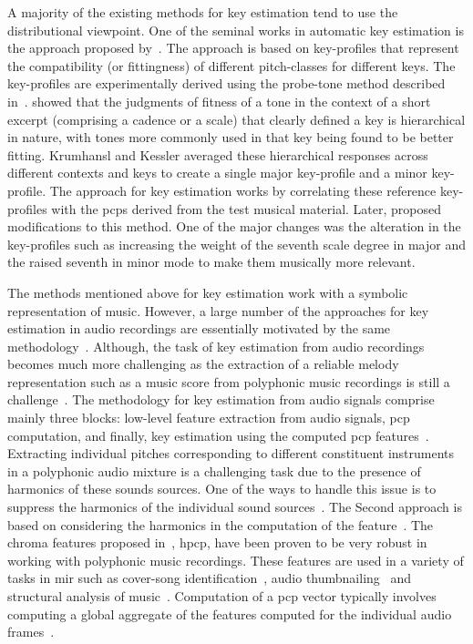 A majority of the existing methods for key estimation tend to use the distributional viewpoint. One of the seminal works in automatic key estimation is the approach proposed by~\cite{KrumhanslKessler82,krumhansl2001cognitive}. The approach is based on key-profiles that represent the compatibility (or fittingness) of different pitch-classes for different keys. The key-profiles are experimentally derived using the probe-tone method described in~\cite{krumhansl1979quantification}. \cite{krumhansl1979quantification} showed that the judgments of fitness of a tone in the context of a short excerpt (comprising a cadence or a scale) that clearly defined a key is hierarchical in nature, with tones more commonly used in that key being found to be better fitting. Krumhansl and Kessler averaged these hierarchical responses across different contexts and keys to create a single major key-profile and a minor key-profile. The approach for key estimation works by correlating these reference key-profiles with the \glspl{pcp} derived from the test musical material. Later, \cite{temperley1999s} proposed modifications to this method. One of the major changes was the alteration in the key-profiles such as increasing the weight of the seventh scale degree in major and the raised seventh in minor mode to make them musically more relevant. 

The methods mentioned above for key estimation work with a symbolic representation of music. However, a large number of the approaches for key estimation in audio recordings are essentially motivated by the same methodology~\citep{gomez2006tonal,pauws2004musical,peeters2006chroma}. Although, the task of key estimation from audio recordings becomes much more challenging as the extraction of a reliable melody representation such as a music score from polyphonic music recordings is still a challenge~\citep{gomez2006tonal}. The methodology for key estimation from audio signals comprise mainly three blocks: low-level feature extraction from audio signals, \gls{pcp} computation, and finally, key estimation using the computed \gls{pcp} features~\citep{peeters2006chroma}. Extracting individual pitches corresponding to different constituent instruments in a polyphonic audio mixture is a challenging task due to the presence of harmonics of these sounds sources. One of the ways to handle this issue is to suppress the harmonics of the individual sound sources~\citep{cremer2004a,peeters2006chroma}. The Second approach is based on considering the harmonics in the computation of the feature~\citep{gomez2006tonal,izmirli2005template}. The chroma features proposed in~\cite{gomez2006tonal}, \gls{hpcp}, have been proven to be very robust in working with polyphonic music recordings. These features are used in a variety of tasks in \gls{mir} such as cover-song identification~\citep{joan_thesis}, audio thumbnailing~\citep{bartsch2001catch} and structural analysis of music~\citep{paulus2006music}. Computation of a \gls{pcp} vector typically involves computing a global aggregate of the features computed for the individual audio frames~\citep{izmirli2005template,pauws2004musical}. 

